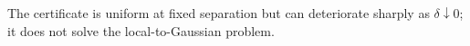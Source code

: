 The certificate is uniform at fixed separation but can deteriorate sharply as \(\delta\downarrow0\); it does not solve the local-to-Gaussian problem.